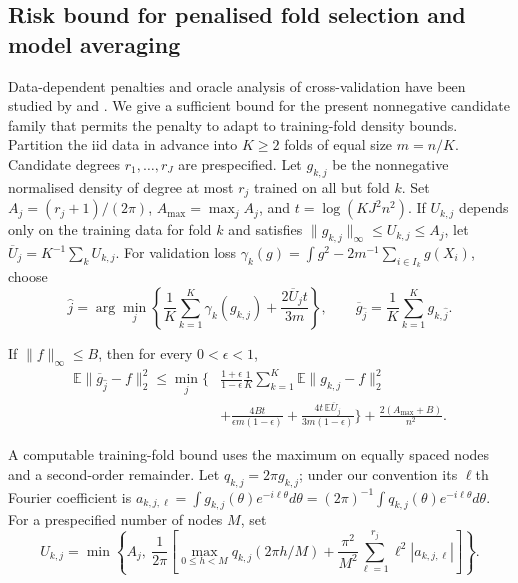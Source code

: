 \subsection{Risk bound for penalised fold selection and model averaging}
Data-dependent penalties and oracle analysis of cross-validation have been studied by \citet{lerasle2012} and \citet{arlot2016}. We give a sufficient bound for the present nonnegative candidate family that permits the penalty to adapt to training-fold density bounds. Partition the iid data in advance into \(K\ge2\) folds of equal size \(m=n/K\). Candidate degrees \(r_1,\ldots,r_J\) are prespecified. Let \(g_{k,j}\) be the nonnegative normalised density of degree at most \(r_j\) trained on all but fold \(k\). Set \(A_j=(r_j+1)/(2\pi)\), \(A_{\max}=\max_j A_j\), and \(t=\log(KJ^2n^2)\). If \(U_{k,j}\) depends only on the training data for fold \(k\) and satisfies \(\|g_{k,j}\|_\infty\le U_{k,j}\le A_j\), let \(\overline U_j=K^{-1}\sum_kU_{k,j}\). For validation loss \(\gamma_k(g)=\int g^2-2m^{-1}\sum_{i\in I_k}g(X_i)\), choose
\begin{equation}\label{eq:selection}
\hat j=\arg\min_j\left\{\frac1K\sum_{k=1}^K\gamma_k(g_{k,j})+\frac{2\overline U_jt}{3m}\right\},\qquad
\overline g_{\hat j}=\frac1K\sum_{k=1}^K g_{k,\hat j}.
\end{equation}
\begin{proposition}\label{prop:oracle}
If \(\|f\|_\infty\le B\), then for every \(0<\epsilon<1\),
\begin{equation}\label{eq:oracle}
\begin{aligned}
\mathbb E\|\overline g_{\hat j}-f\|_2^2\le\min_j\bigg\{&
\frac{1+\epsilon}{1-\epsilon}\frac1K\sum_{k=1}^K\mathbb E\|g_{k,j}-f\|_2^2\\
&+\frac{4Bt}{\epsilon m(1-\epsilon)}+\frac{4t\,\mathbb E\overline U_j}{3m(1-\epsilon)}\bigg\}
+\frac{2(A_{\max}+B)}{n^2}.
\end{aligned}
\end{equation}
\end{proposition}
A computable training-fold bound uses the maximum on equally spaced nodes and a second-order remainder. Let \(q_{k,j}=2\pi g_{k,j}\); under our convention its \(\ell\)th Fourier coefficient is \(a_{k,j,\ell}=\int g_{k,j}(\theta)e^{-i\ell\theta}d\theta=(2\pi)^{-1}\int q_{k,j}(\theta)e^{-i\ell\theta}d\theta\). For a prespecified number of nodes \(M\), set
\begin{equation}\label{eq:foldbound}
U_{k,j}=\min\left\{A_j,\ \frac1{2\pi}\left[
\max_{0\le h<M}q_{k,j}(2\pi h/M)+\frac{\pi^2}{M^2}\sum_{\ell=1}^{r_j}\ell^2|a_{k,j,\ell}|\right]\right\}.
\end{equation}
